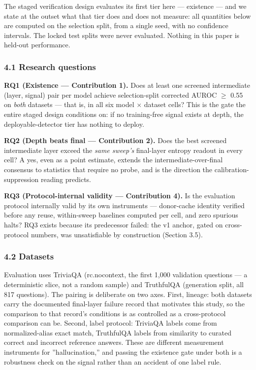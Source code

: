 
The staged verification design evaluates its first tier here --- existence --- and we state at the outset what that tier does and does not measure: all quantities below are computed on the selection split, from a single seed, with no confidence intervals. The locked test splits were never evaluated. Nothing in this paper is held-out performance.

\subsubsection{4.1 Research questions}

\textbf{RQ1 (Existence --- Contribution 1).} Does at least one screened intermediate (layer, signal) pair per model achieve selection-split corrected AUROC $\geq$ 0.55 on \textit{both} datasets --- that is, in all six model $\times$ dataset cells? This is the gate the entire staged design conditions on: if no training-free signal exists at depth, the deployable-detector tier has nothing to deploy.

\textbf{RQ2 (Depth beats final --- Contribution 2).} Does the best screened intermediate layer exceed the \textit{same sweep's} final-layer entropy readout in every cell? A yes, even as a point estimate, extends the intermediate-over-final consensus to statistics that require no probe, and is the direction the calibration-suppression reading predicts.

\textbf{RQ3 (Protocol-internal validity --- Contribution 4).} Is the evaluation protocol internally valid by its own instruments --- donor-cache identity verified before any reuse, within-sweep baselines computed per cell, and zero spurious halts? RQ3 exists because its predecessor failed: the v1 anchor, gated on cross-protocol numbers, was unsatisfiable by construction (Section 3.5).

\subsubsection{4.2 Datasets}

Evaluation uses TriviaQA (rc.nocontext, the first 1,000 validation questions --- a deterministic slice, not a random sample) and TruthfulQA (generation split, all 817 questions). The pairing is deliberate on two axes. First, lineage: both datasets carry the documented final-layer failure record that motivates this study, so the comparison to that record's conditions is as controlled as a cross-protocol comparison can be. Second, label protocol: TriviaQA labels come from normalized-alias exact match, TruthfulQA labels from similarity to curated correct and incorrect reference answers. These are different measurement instruments for ''hallucination,'' and passing the existence gate under both is a robustness check on the signal rather than an accident of one label rule.

